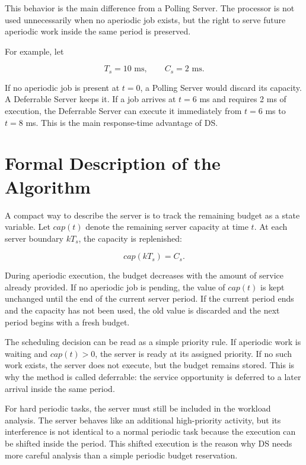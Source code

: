 \documentclass[conference]{IEEEtran}
\begin{document}
	This behavior is the main difference from a Polling Server. The processor is not used unnecessarily when no aperiodic job exists, but the right to serve future aperiodic work inside the same period is preserved.
	
	For example, let
	
	\begin{equation}
		T_s = 10 \text{ ms}, \qquad C_s = 2 \text{ ms}.
	\end{equation}
	
	If no aperiodic job is present at $t=0$, a Polling Server would discard its capacity. A Deferrable Server keeps it. If a job arrives at $t=6$ ms and requires 2 ms of execution, the Deferrable Server can execute it immediately from $t=6$ ms to $t=8$ ms. This is the main response-time advantage of DS.
	
	\section{Formal Description of the Algorithm}
	
	A compact way to describe the server is to track the remaining budget as a state variable. Let $cap(t)$ denote the remaining server capacity at time $t$. At each server boundary $kT_s$, the capacity is replenished:
	
	\begin{equation}
		cap(kT_s) = C_s.
	\end{equation}
	
	During aperiodic execution, the budget decreases with the amount of service already provided. If no aperiodic job is pending, the value of $cap(t)$ is kept unchanged until the end of the current server period. If the current period ends and the capacity has not been used, the old value is discarded and the next period begins with a fresh budget.
	
	The scheduling decision can be read as a simple priority rule. If aperiodic work is waiting and $cap(t)>0$, the server is ready at its assigned priority. If no such work exists, the server does not execute, but the budget remains stored. This is why the method is called deferrable: the service opportunity is deferred to a later arrival inside the same period.
	
	For hard periodic tasks, the server must still be included in the workload analysis. The server behaves like an additional high-priority activity, but its interference is not identical to a normal periodic task because the execution can be shifted inside the period. This shifted execution is the reason why DS needs more careful analysis than a simple periodic budget reservation.
	
\end{document}
